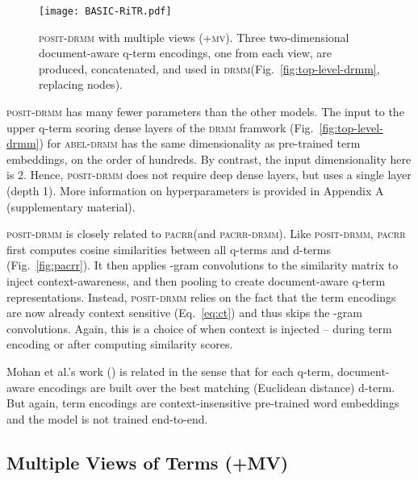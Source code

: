 \documentclass[11pt,a4paper]{article}
\newcommand{\drmm}{\textsc{drmm}\xspace}
\newcommand{\pacrr}{\textsc{pacrr}\xspace}
\newcommand{\pacrrdrmm}{\textsc{pacrr-drmm}\xspace}
\newcommand{\abeldrmm}{\textsc{abel-drmm}\xspace}
\newcommand{\positdrmm}{\textsc{posit-drmm}\xspace}
\begin{document}
\begin{figure}[t]
\texttt{[image: BASIC-RiTR.pdf]}
\vspace{-0.15in}
\caption{\positdrmm with multiple views (\textsc{+mv}). Three two-dimensional document-aware q-term encodings, one from each view, are produced, concatenated, and used in \drmm (Fig.~\ref{fig:top-level-drmm}, replacing  nodes).}
\vspace{-4mm}
\label{fig:basic-ritr}
\end{figure}

\positdrmm has many fewer parameters than the other models. The input to the upper q-term scoring dense layers of the \drmm framwork (Fig.~\ref{fig:top-level-drmm}) for \abeldrmm has the same dimensionality as pre-trained term embeddings, on the order of hundreds. By contrast, the input dimensionality here is 2. 
Hence, \positdrmm does not require deep dense layers, but uses a single layer (depth 1).
More information on hyperparameters is provided in Appendix A (supplementary material).

\positdrmm is closely related to \pacrr (and \pacrrdrmm). Like \positdrmm, \pacrr first computes cosine similarities between all q-terms and d-terms (Fig.~\ref{fig:pacrr}). It then applies -gram convolutions to the similarity matrix to inject context-awareness, and then pooling to create document-aware q-term representations. Instead, \positdrmm relies on the fact that the term encodings are now already context sensitive (Eq.~\ref{eq:ct}) and thus skips the -gram convolutions. Again, this is a choice of when context is injected -- during term encoding or after computing similarity scores. 

Mohan et al.'s work (\citeyear{mohan2017deep}) is related in the sense that for each q-term, document-aware encodings are built over the best matching (Euclidean distance) d-term. But again, term encodings are context-insensitive pre-trained word embeddings and the model is not trained end-to-end.



\subsection{Multiple Views of Terms (+MV)}
\label{sec:multiview}
\end{document}
